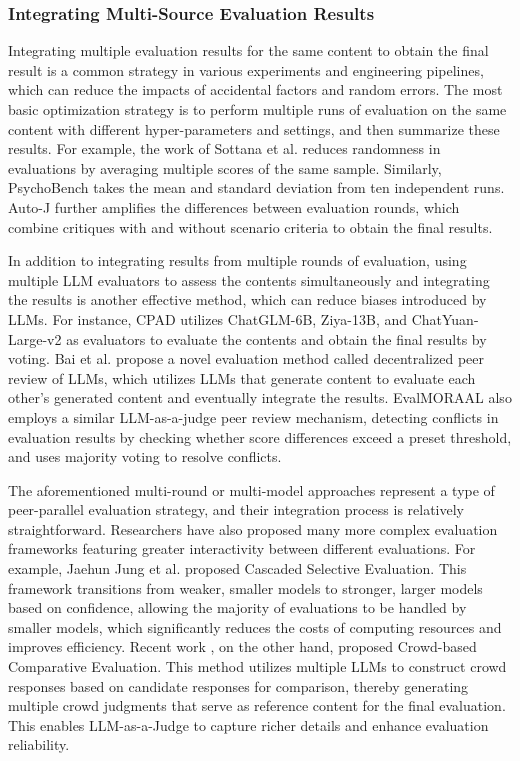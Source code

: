 \subsubsection{\textbf{Integrating Multi-Source Evaluation Results}}\label{subsubsec:integrate_multiple}

Integrating multiple evaluation results for the same content to obtain the final result is a common strategy in various experiments and engineering pipelines, which can reduce the impacts of accidental factors and random errors. 
The most basic optimization strategy is to perform multiple runs of evaluation on the same content with different hyper-parameters and settings, and then summarize these results. For example, the work of Sottana et al.\cite{sottana2023evaluation} reduces randomness in evaluations by averaging multiple scores of the same sample. Similarly, PsychoBench\cite{psycho_bench} takes the mean and standard deviation from ten independent runs. Auto-J\cite{auto-j} further amplifies the differences between evaluation rounds, which combine critiques with and without scenario criteria to obtain the final results.

In addition to integrating results from multiple rounds of evaluation, using multiple LLM evaluators to assess the contents simultaneously and integrating the results is another effective method, which can reduce biases introduced by LLMs. For instance, CPAD\cite{cpad} utilizes ChatGLM-6B\cite{chatglm}, Ziya-13B\cite{ziya}, and ChatYuan-Large-v2\cite{chatyuan} as evaluators to evaluate the contents and obtain the final results by voting. Bai et al.\cite{lm-as-an-examiner} propose a novel evaluation method called decentralized peer review of LLMs, which utilizes LLMs that generate content to evaluate each other's generated content and eventually integrate the results. 
EvalMORAAL\cite{mohammadi2025evalmoraal} also employs a similar LLM-as-a-judge peer review mechanism, detecting conflicts in evaluation results by checking whether score differences exceed a preset threshold, and uses majority voting to resolve conflicts.

The aforementioned multi-round or multi-model approaches represent a type of peer-parallel evaluation strategy, and their integration process is relatively straightforward. Researchers have also proposed many more complex evaluation frameworks featuring greater interactivity between different evaluations. For example, Jaehun Jung et al. proposed Cascaded Selective Evaluation\cite{jung2024trust}. This framework transitions from weaker, smaller models to stronger, larger models based on confidence, allowing the majority of evaluations to be handled by smaller models, which significantly reduces the costs of computing resources and improves efficiency. Recent work \cite{zhang2025crowd}, on the other hand, proposed Crowd-based Comparative Evaluation. This method utilizes multiple LLMs to construct crowd responses based on candidate responses for comparison, thereby generating multiple crowd judgments that serve as reference content for the final evaluation. This enables LLM-as-a-Judge to capture richer details and enhance evaluation reliability.


